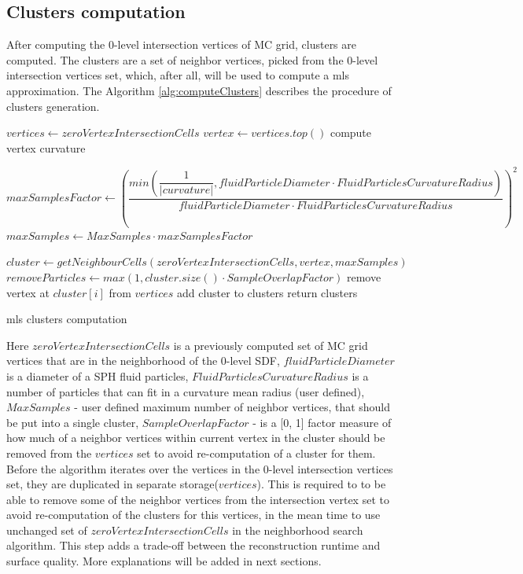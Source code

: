 \subsection{Clusters computation}
After computing the 0-level intersection vertices of MC grid, clusters are computed. The clusters are a set of neighbor vertices, picked from the 0-level intersection vertices set, which, after all, will be used to compute a mls approximation. The Algorithm \ref{alg:computeClusters} describes the procedure of clusters generation.
\begin{algorithm}[H]
	\scriptsize
	\begin{algorithmic}
			\State $vertices \gets zeroVertexIntersectionCells$
				\State $vertex \gets vertices.top()$
				\State compute vertex curvature

				\State $maxSamplesFactor \gets \left(\dfrac{min(\dfrac{1}{|curvature|}, fluidParticleDiameter \cdot FluidParticlesCurvatureRadius)}{fluidParticleDiameter \cdot FluidParticlesCurvatureRadius}\right)^2$
				\State $maxSamples \gets MaxSamples \cdot maxSamplesFactor$

				\State $cluster \gets getNeighbourCells(zeroVertexIntersectionCells, vertex, maxSamples)$
				\State $removeParticles \gets max(1, cluster.size() \cdot SampleOverlapFactor)$
					\State remove vertex at $cluster[i]$ from $vertices$
				\EndFor
				\State add cluster to clusters
			\EndWhile
			\State return clusters
	\end{algorithmic}
	\caption{mls clusters computation}
	\label{alg:computeClusters}
\end{algorithm}
Here $zeroVertexIntersectionCells$ is a previously computed set of MC grid vertices  that are in the neighborhood of the 0-level SDF,  
$fluidParticleDiameter$ is a diameter of a SPH fluid particles, $FluidParticlesCurvatureRadius$ is a number of particles that can fit in a curvature mean radius (user defined), $MaxSamples$ - user defined maximum number of neighbor vertices, that should be put into a single cluster, $SampleOverlapFactor$ - is a [0, 1] factor measure of how much of a neighbor  vertices within current vertex in the cluster should be removed from the $vertices$ set to avoid re-computation of a cluster for them.\\
Before the algorithm iterates over the vertices in the 0-level intersection vertices set, they are duplicated in separate storage($vertices$). This is required to to be able to remove some of the neighbor vertices from the intersection vertex set to avoid re-computation of the clusters for this vertices, in the mean time to use unchanged set of $zeroVertexIntersectionCells$ in the neighborhood search algorithm. This step adds a trade-off between the reconstruction runtime and surface quality. More explanations will be added in next sections.\\
